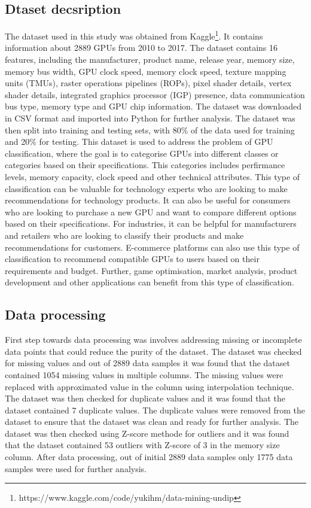\documentclass[conference,onecolumn]{IEEEtran}
\begin{document}
\subsection{Dtaset decsription}
    The dataset used in this study was obtained from Kaggle\footnote{https://www.kaggle.com/code/yukihm/data-mining-undip}. It contains information about 2889 GPUs from 2010 to 2017. The dataset contains 16 features, including the manufacturer, product name, release year, memory size, memory bus width, GPU clock speed, memory clock speed, texture mapping units (TMUs), raster operations pipelines (ROPs), pixel shader details, vertex shader details, integrated graphics processor (IGP) presence, data communication bus type, memory type and GPU chip information. The dataset was downloaded in CSV format and imported into Python for further analysis. The dataset was then split into training and testing sets, with 80\% of the data used for training and 20\% for testing. 
    This dataset is used to address the problem of GPU classification, where the goal is to categorise GPUs into different classes or categories based on their specifications. This categories includes perfirmance levels, memory capacity, clock speed and other technical attributes. This type of classification can be valuable for technology experts who are looking to make recommendations for technology products. It can also be useful for consumers who are looking to purchase a new GPU and want to compare different options based on their specifications. For industries, it can be helpful for manufacturers and retailers who are looking to classify their products and make recommendations for customers. E-commerce platforms can also use this type of classification to recommend compatible GPUs to users based on their requirements and budget. Further, game optimisation, market analysis, product development and other applications can benefit from this type of classification.
\subsection{Data processing}
    First step towards data processing was involves addressing missing or incomplete data points that could reduce the purity of the dataset. The dataset was checked for missing values and out of 2889 data samples it was found that the dataset contained 1054 missing values in multiple columns. The missing values were replaced with approximated value in the column using interpolation technique. The dataset was then checked for duplicate values and it was found that the dataset contained 7 duplicate values. The duplicate values were removed from the dataset to ensure that the dataset was clean and ready for further analysis. The dataset was then checked using Z-score methode for outliers and it was found that the dataset contained 53 outliers with Z-score of 3 in the memory size column.
    After data processing, out of initial 2889 data samples only 1775 data samples were used for further analysis.

\end{document}
